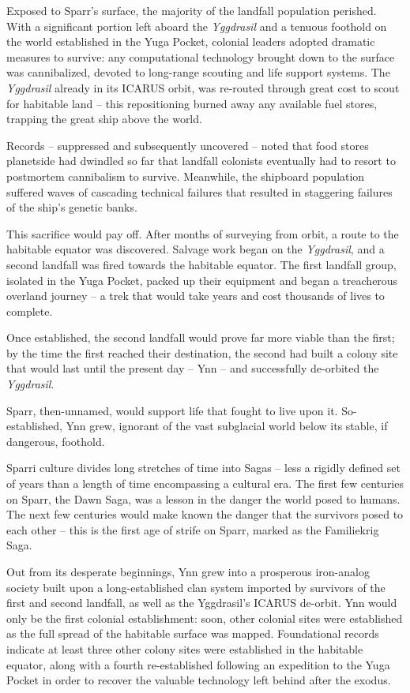 Exposed to Sparr's surface, the majority of the landfall population perished. With a significant
portion left aboard the \textit{Yggdrasil} and a tenuous foothold on the world established in the Yuga
Pocket, colonial leaders adopted dramatic measures to survive: any computational technology
brought down to the surface was cannibalized, devoted to long-range scouting and life support
systems. The \textit{Yggdrasil} already in its ICARUS orbit, was re-routed through great cost to scout for
habitable land -- this repositioning burned away any available fuel stores, trapping the great ship
above the world.

Records -- suppressed and subsequently uncovered -- noted that food stores planetside had
dwindled so far that landfall colonists eventually had to resort to postmortem cannibalism to
survive. Meanwhile, the shipboard population suffered waves of cascading technical failures that
resulted in staggering failures of the ship's genetic banks.

This sacrifice would pay off. After months of surveying from orbit, a route to the habitable equator
was discovered. Salvage work began on the \textit{Yggdrasil}, and a second landfall was fired towards
the habitable equator. The first landfall group, isolated in the Yuga Pocket, packed up their
equipment and began a treacherous overland journey -- a trek that would take years and cost
thousands of lives to complete.

Once established, the second landfall would prove far more viable than the first; by the time the
first reached their destination, the second had built a colony site that would last until the present
day -- Ynn -- and successfully de-orbited the \textit{Yggdrasil}.

Sparr, then-unnamed, would support life that fought to live upon it. So-established, Ynn grew,
ignorant of the vast subglacial world below its stable, if dangerous, foothold.

Sparri culture divides long stretches of time into Sagas -- less a rigidly defined set of years than a
length of time encompassing a cultural era. The first few centuries on Sparr, the Dawn Saga, was
a lesson in the danger the world posed to humans. The next few centuries would make known the
danger that the survivors posed to each other -- this is the first age of strife on Sparr, marked as
the Familiekrig Saga.

Out from its desperate beginnings, Ynn grew into a prosperous iron-analog society built upon a
long-established clan system imported by survivors of the first and second landfall, as well as the
Yggdrasil's ICARUS de-orbit. Ynn would only be the first colonial establishment: soon, other
colonial sites were established as the full spread of the habitable surface was mapped.
Foundational records indicate at least three other colony sites were established in the habitable
equator, along with a fourth re-established following an expedition to the Yuga Pocket in order to
recover the valuable technology left behind after the exodus.

